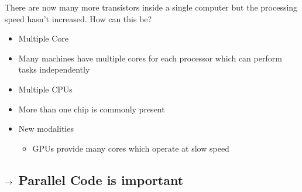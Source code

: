 \documentclass[letterpaper,10pt,english]{sphinxmanual}
\begin{document}
\sphinxAtStartPar
There are now many more transistors inside a single computer but the processing speed hasn’t increased. How can this be?
\begin{itemize}
\item {} 
\sphinxAtStartPar
Multiple Core

\item {} 
\sphinxAtStartPar
Many machines have multiple cores for each processor which can perform tasks independently

\item {} 
\sphinxAtStartPar
Multiple CPUs

\item {} 
\sphinxAtStartPar
More than one chip is commonly present

\item {} 
\sphinxAtStartPar
New modalities
\begin{itemize}
\item {} 
\sphinxAtStartPar
GPUs provide many cores which operate at slow speed

\end{itemize}

\end{itemize}


\subsection{\protect\(\rightarrow\protect\) Parallel Code is important}
\label{\detokenize{01-Introduction:rightarrow-parallel-code-is-important}}
\end{document}
